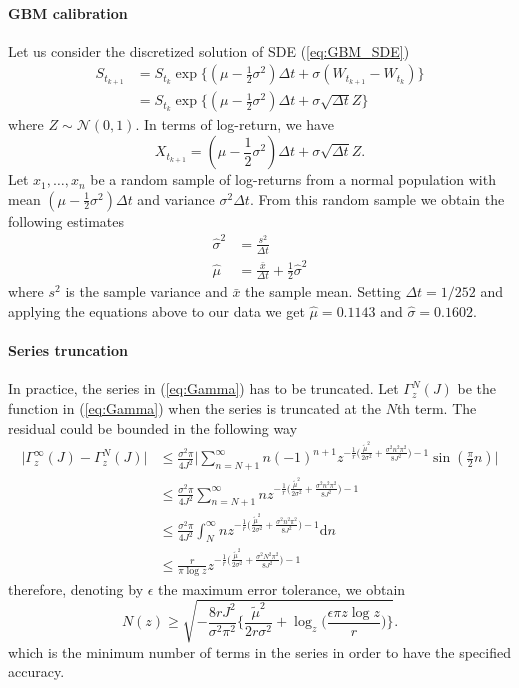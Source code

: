 \paragraph{\gls{GBM} calibration}
Let us consider the discretized solution of \gls{SDE} (\ref{eq:GBM_SDE})
\begin{align*}
S_{t_{k+1}} & = S_{t_k}\exp\big\{(\mu-\frac{1}{2}\sigma^2)\Delta t+\sigma(W_{t_{k+1}}-W_{t_k})\big\} \\
& = S_{t_k}\exp\big\{(\mu-\frac{1}{2}\sigma^2)\Delta t+\sigma\sqrt{\Delta t}Z\big\}
\end{align*}
where $Z \sim \mathcal{N}(0,1)$. In terms of log-return, we have
\[X_{t_{k+1}} = (\mu-\frac{1}{2}\sigma^2)\Delta t+\sigma\sqrt{\Delta t}Z.\] 
Let $x_1,\ldots,x_n$ be a random sample of log-returns from a normal population with mean $(\mu-\frac{1}{2}\sigma^2)\Delta t$ and variance $\sigma^2 \Delta t$. From this random sample we obtain the following estimates
\begin{align*}
\widehat{\sigma}^2 & = \frac{s^2}{\Delta t}\\[1.5ex]
\widehat{\mu} & = \frac{\bar{x}}{\Delta t} + \frac{1}{2}\widehat{\sigma}^2
\end{align*}
where $s^2$ is the sample variance and $\bar{x}$ the sample mean. Setting $\Delta t = 1/252$ and applying the equations above to our data we get $\widehat{\mu} = 0.1143$ and $\widehat{\sigma} = 0.1602$.


\paragraph{Series truncation}
In practice, the series in (\ref{eq:Gamma}) has to be truncated. Let $\Gamma^N_z(J)$ be the function in (\ref{eq:Gamma}) when the series is truncated at the $N$th term. The residual could be bounded in the following way
\begin{align*}
\big\lvert\Gamma^{\infty}_z(J)-\Gamma^N_z(J)\big\lvert & \leq \frac{\sigma^2\pi}{4J^2}\bigg\lvert\sum_{n=N+1}^{\infty}n(-1)^{n+1}z^{-\frac{1}{r}\big(\frac{\tilde{\mu}^2}{2\sigma^2} + \frac{\sigma^2n^2\pi^2}{8J^2}\big)-1}\sin(\frac{\pi}{2}n)\bigg\lvert\\
& \leq \frac{\sigma^2\pi}{4J^2} \sum_{n=N+1}^{\infty}nz^{-\frac{1}{r}\big(\frac{\tilde{\mu}^2}{2\sigma^2} + \frac{\sigma^2n^2\pi^2}{8J^2}\big)-1}\\
& \leq \frac{\sigma^2\pi}{4J^2} \int_{N}^{\infty}nz^{-\frac{1}{r}\big(\frac{\tilde{\mu}^2}{2\sigma^2} + \frac{\sigma^2n^2\pi^2}{8J^2}\big)-1}\mathrm{d}n\\
& \leq \frac{r}{\pi \log z}z^{-\frac{1}{r}\big(\frac{\tilde{\mu}^2}{2\sigma^2} + \frac{\sigma^2N^2\pi^2}{8J^2}\big)-1}
\end{align*}
therefore, denoting by $\epsilon$ the maximum error tolerance, we obtain
\begin{equation}
N(z) \geq \sqrt{-\frac{8rJ^2}{\sigma^2\pi^2}\bigg\{\frac{\widetilde{\mu}^2}{2r\sigma^2}+\log_z\Big(\frac{\epsilon\pi z \log z}{r}\Big) \bigg\}}.
\end{equation}
which is the minimum number of terms in the series in order to have the specified accuracy.

